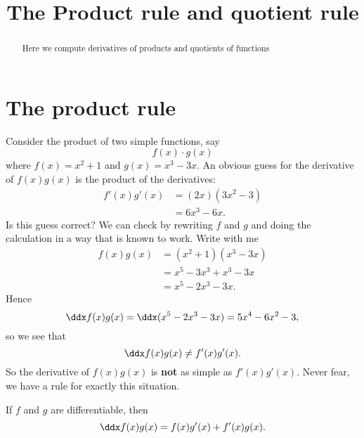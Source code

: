 \documentclass{ximera}
\title[Dig-In:]{The Product rule and quotient rule}
\begin{document}
\begin{abstract}
Here we compute derivatives of products and quotients of functions
\end{abstract}
\maketitle


\section{The product rule}


Consider the product of two simple functions, say
\[
f(x)\cdot g(x)
\]
where $f(x)=x^2+1$ and $g(x)=x^3-3x$. An obvious guess for the
derivative of $f(x)g(x)$ is the product of the derivatives:
\begin{align*}
	f'(x)g'(x) &= (2x)(3x^2-3)\\
		&= 6x^3-6x.
\end{align*}
Is this guess correct? We can check by rewriting $f$ and $g$ and doing
the calculation in a way that is known to work. Write with me
\begin{align*}
	f(x)g(x) &= (x^2+1)(x^3-3x)\\
		&=x^5-3x^3+x^3-3x\\
		&=x^5-2x^3-3x.
\end{align*} 
Hence
\[ \ddx f(x) g(x) = \ddx(x^5 - 2x^3 - 3x) = 5x^4-6x^2-3,  \]
so we see that 
\[ \ddx f(x) g(x) \ne  f'(x)g'(x). \]
So the derivative of $f(x)g(x)$ is \textbf{not} as simple as
$f'(x)g'(x)$. Never fear, we have a rule for exactly this situation.

\begin{theorem}\label{theorem:product-rule}
	If $f$ and $g$ are differentiable, then
	\[ \ddx f(x)g(x) = f(x)g'(x)+f'(x)g(x).\]
\end{theorem}

\end{document}

